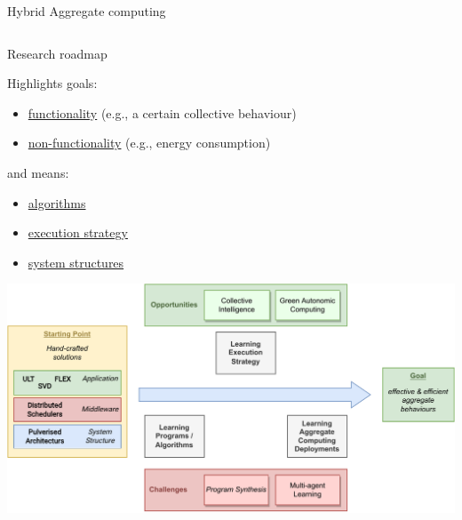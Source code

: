 \documentclass[presentation, 9pt, aspectratio=169]{beamer}\mode<presentation>{\usetheme{AMSBolognaFC}}
\begin{document}
\begin{frame}{Hybrid Aggregate computing}
\vspace{-0.5cm}
\begin{columns}[t]
\begin{column}{0.31\textwidth}
\begin{exampleblock}{Research roadmap~\cite{DBLP:conf/icdcs/AguzziCV22}}
  \footnotesize{
  Highlights goals:
\begin{itemize}
  \item \underline{functionality} (e.g., a certain collective behaviour)
  \item \underline{non-functionality} (e.g., energy consumption)
\end{itemize}}
and means:
\begin{itemize}
  \item \underline{algorithms}
  \item \underline{execution strategy}
  \item \underline{system structures}
\end{itemize}
  \includegraphics[width=\textwidth]{img/roadmap.pdf}
\end{exampleblock}
\end{column}


\end{columns}
\end{frame}
\end{document}
